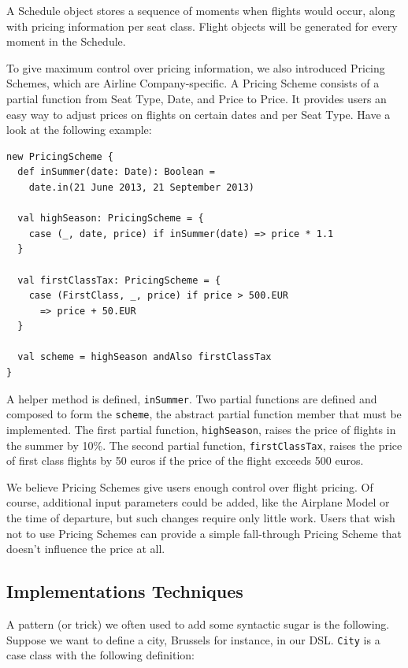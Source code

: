 \documentclass[a4paper]{article}
\newcommand{\cc}[1]{\texttt{#1}}
\renewcommand{\sc}[1]{\lstinline{#1}}
\begin{document}
A Schedule object stores a sequence of moments when flights would occur, along with pricing information per seat class.
Flight objects will be generated for every moment in the Schedule.

To give maximum control over pricing information, we also introduced Pricing Schemes, which are Airline Company-specific.
A Pricing Scheme consists of a partial function from Seat Type, Date, and Price to Price.
It provides users an easy way to adjust prices on flights on certain dates and per Seat Type.
Have a look at the following example:

\begin{lstlisting}
new PricingScheme {
  def inSummer(date: Date): Boolean =
    date.in(21 June 2013, 21 September 2013)

  val highSeason: PricingScheme = {
    case (_, date, price) if inSummer(date) => price * 1.1
  }

  val firstClassTax: PricingScheme = {
    case (FirstClass, _, price) if price > 500.EUR
      => price + 50.EUR
  }

  val scheme = highSeason andAlso firstClassTax
}
\end{lstlisting}

A helper method is defined, \sc{inSummer}.
Two partial functions are defined and composed to form the \sc{scheme}, the abstract partial function member that must be implemented.
The first partial function, \sc{highSeason}, raises the price of flights in the summer by 10\%.
The second partial function, \sc{firstClassTax}, raises the price of first class flights by 50 euros if the price of the flight exceeds 500 euros.

We believe Pricing Schemes give users enough control over flight pricing.
Of course, additional input parameters could be added, like the Airplane Model or the time of departure, but such changes require only little work.
Users that wish not to use Pricing Schemes can provide a simple fall-through Pricing Scheme that doesn't influence the price at all.

\subsection{Implementations Techniques}
\label{sec:implementation-techniques}

A pattern (or trick) we often used to add some syntactic sugar is the following.
Suppose we want to define a city, Brussels for instance, in our DSL.\@
\cc{City} is a case class with the following definition:
\end{document}
